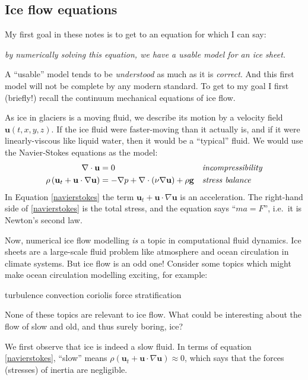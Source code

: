 \documentclass[letterpaper,final,12pt,reqno]{amsart}
\begin{document}
\subsection{Ice flow equations}

My first goal in these notes is to get to an equation for which I can say:
\begin{center}
\emph{by numerically solving this equation, we have a usable model for an ice sheet.}
\end{center}
\noindent A ``usable'' model tends to be \emph{understood} as much as it is \emph{correct}.  And this first model will not be complete by any modern standard.  To get to my goal I first (briefly!) recall the continuum mechanical equations of ice flow.  

As ice in glaciers is a moving fluid, we describe its motion by a velocity field $\mathbf{u}(t,x,y,z)$.  If the ice fluid were faster-moving than it actually is, and if it were linearly-viscous like liquid water, then it would be a ``typical'' fluid.  We would use the Navier-Stokes equations as the model:
\begin{align}
\nabla \cdot \mathbf{u} &= 0 &&\text{\emph{incompressibility}} \label{incompressible} \\
\rho \left(\mathbf{u}_t + \mathbf{u}\cdot\nabla \mathbf{u}\right) &= -\nabla p + \nabla \cdot (\nu \nabla \mathbf{u}) + \rho \mathbf{g} &&\text{\emph{stress balance}} \label{navierstokes}
\end{align}
In Equation \eqref{navierstokes} the term $\mathbf{u}_t + \mathbf{u}\cdot\nabla \mathbf{u}$ is an acceleration.  The right-hand side of \eqref{navierstokes} is the total stress, and the equation says ``$ma=F$'', i.e.~it is Newton's second law.

Now, numerical ice flow modelling \emph{is} a topic in computational fluid dynamics.  Ice sheets are a large-scale fluid problem like atmosphere and ocean circulation in climate systems.  But ice flow is an odd one!  Consider some topics which might make ocean circulation modelling exciting, for example:
  \begin{center} turbulence \qquad convection \qquad  coriolis force  \qquad stratification
  \end{center}
None of these topics are relevant to ice flow.  What could be interesting about the flow of slow and old, and thus surely boring, ice?

We first observe that ice is indeed a slow fluid.  In terms of equation \eqref{navierstokes}, ``slow'' means $\rho \left(\mathbf{u}_t + \mathbf{u}\cdot\nabla \mathbf{u}\right) \approx 0$, which says that the forces (stresses) of inertia are negligible.  
\end{document}
